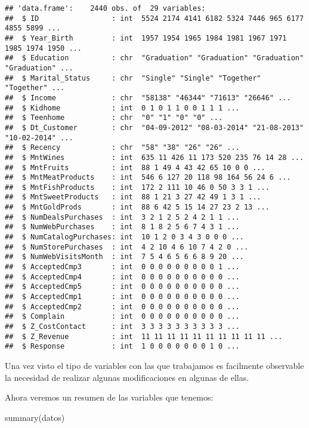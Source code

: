 \documentclass[
]{article}
\newenvironment{Shaded}{\begin{snugshade}}{\end{snugshade}}
\newcommand{\FunctionTok}[1]{\textcolor[rgb]{0.00,0.00,0.00}{#1}}
\newcommand{\NormalTok}[1]{#1}
\begin{document}
\begin{verbatim}
## 'data.frame':    2440 obs. of  29 variables:
##  $ ID                 : int  5524 2174 4141 6182 5324 7446 965 6177 4855 5899 ...
##  $ Year_Birth         : int  1957 1954 1965 1984 1981 1967 1971 1985 1974 1950 ...
##  $ Education          : chr  "Graduation" "Graduation" "Graduation" "Graduation" ...
##  $ Marital_Status     : chr  "Single" "Single" "Together" "Together" ...
##  $ Income             : chr  "58138" "46344" "71613" "26646" ...
##  $ Kidhome            : int  0 1 0 1 1 0 0 1 1 1 ...
##  $ Teenhome           : chr  "0" "1" "0" "0" ...
##  $ Dt_Customer        : chr  "04-09-2012" "08-03-2014" "21-08-2013" "10-02-2014" ...
##  $ Recency            : chr  "58" "38" "26" "26" ...
##  $ MntWines           : int  635 11 426 11 173 520 235 76 14 28 ...
##  $ MntFruits          : int  88 1 49 4 43 42 65 10 0 0 ...
##  $ MntMeatProducts    : int  546 6 127 20 118 98 164 56 24 6 ...
##  $ MntFishProducts    : int  172 2 111 10 46 0 50 3 3 1 ...
##  $ MntSweetProducts   : int  88 1 21 3 27 42 49 1 3 1 ...
##  $ MntGoldProds       : int  88 6 42 5 15 14 27 23 2 13 ...
##  $ NumDealsPurchases  : int  3 2 1 2 5 2 4 2 1 1 ...
##  $ NumWebPurchases    : int  8 1 8 2 5 6 7 4 3 1 ...
##  $ NumCatalogPurchases: int  10 1 2 0 3 4 3 0 0 0 ...
##  $ NumStorePurchases  : int  4 2 10 4 6 10 7 4 2 0 ...
##  $ NumWebVisitsMonth  : int  7 5 4 6 5 6 6 8 9 20 ...
##  $ AcceptedCmp3       : int  0 0 0 0 0 0 0 0 0 1 ...
##  $ AcceptedCmp4       : int  0 0 0 0 0 0 0 0 0 0 ...
##  $ AcceptedCmp5       : int  0 0 0 0 0 0 0 0 0 0 ...
##  $ AcceptedCmp1       : int  0 0 0 0 0 0 0 0 0 0 ...
##  $ AcceptedCmp2       : int  0 0 0 0 0 0 0 0 0 0 ...
##  $ Complain           : int  0 0 0 0 0 0 0 0 0 0 ...
##  $ Z_CostContact      : int  3 3 3 3 3 3 3 3 3 3 ...
##  $ Z_Revenue          : int  11 11 11 11 11 11 11 11 11 11 ...
##  $ Response           : int  1 0 0 0 0 0 0 0 1 0 ...
\end{verbatim}

Una vez visto el tipo de variables con las que trabajamos es facilmente
observable la necesidad de realizar algunas modificaciones en algunas de
ellas.

Ahora veremos un resumen de las variables que tenemos:

\begin{Shaded}
\begin{Highlighting}[]
\FunctionTok{summary}\NormalTok{(datos)}
\end{Highlighting}
\end{Shaded}
\end{document}
